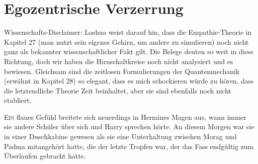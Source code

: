 \chapter{Egozentrische Verzerrung}

\begin{chapterOpeningAuthorNote}
%
Wissenschafts-Disclaimer: Loshua weist darauf hin, dass die Empathie-Theorie in Kapitel 27 (man nutzt sein eigenes Gehirn, um andere zu simulieren) noch nicht ganz als bekannter wissenschaftlicher Fakt gilt. Die Belege deuten so weit in diese Richtung, doch wir haben die Hirnschaltkreise noch nicht analysiert und es bewiesen. Gleichsam sind die zeitlosen Formulierungen der Quantenmechanik (erwähnt in Kapitel 28) so elegant, dass es mich schockieren würde zu hören, dass die letztendliche Theorie Zeit beinhaltet, aber sie sind ebenfalls noch nicht etabliert.
\end{chapterOpeningAuthorNote}

\lettrine{E}{in} flaues Gefühl breitete sich neuerdings in Hermines Magen aus, wann immer sie andere Schüler über sich und Harry sprechen hörte. An diesem Morgen war sie in einer Duschkabine gewesen als sie eine Unterhaltung zwischen Morag und Padma mitangehört hatte, die der letzte Tropfen war, der das Fass endgültig zum Überlaufen gebracht hatte.

